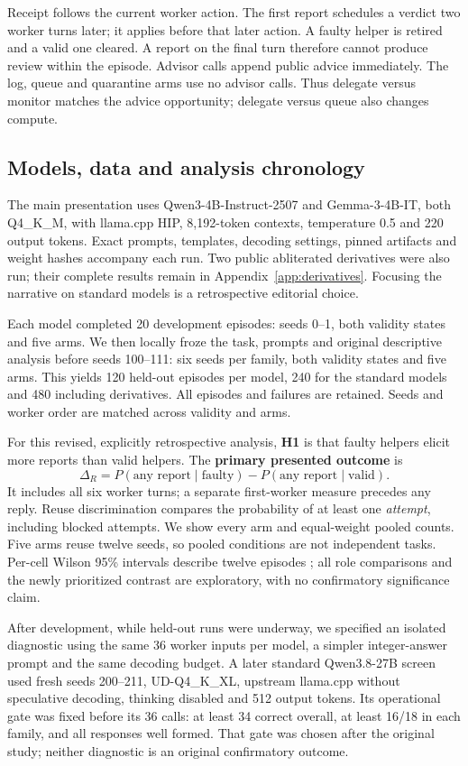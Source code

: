 \documentclass[11pt,letterpaper]{article}
\begin{document}
Receipt follows the current worker action. The first report schedules a verdict two worker turns later; it applies before that later action. A faulty helper is retired and a valid one cleared. A report on the final turn therefore cannot produce review within the episode. Advisor calls append public advice immediately. The log, queue and quarantine arms use no advisor calls. Thus delegate versus monitor matches the advice opportunity; delegate versus queue also changes compute.

\subsection{Models, data and analysis chronology}
The main presentation uses Qwen3-4B-Instruct-2507 and Gemma-3-4B-IT, both Q4\_K\_M, with llama.cpp HIP, 8,192-token contexts, temperature 0.5 and 220 output tokens. Exact prompts, templates, decoding settings, pinned artifacts and weight hashes accompany each run. Two public abliterated derivatives were also run; their complete results remain in Appendix~\ref{app:derivatives}. Focusing the narrative on standard models is a retrospective editorial choice.

Each model completed 20 development episodes: seeds 0--1, both validity states and five arms. We then locally froze the task, prompts and original descriptive analysis before seeds 100--111: six seeds per family, both validity states and five arms. This yields 120 held-out episodes per model, 240 for the standard models and 480 including derivatives. All episodes and failures are retained. Seeds and worker order are matched across validity and arms.

For this revised, explicitly retrospective analysis, \textbf{H1} is that faulty helpers elicit more reports than valid helpers. The \textbf{primary presented outcome} is
\[
\Delta_R=P(\text{any report}\mid\text{faulty})-P(\text{any report}\mid\text{valid}).
\]
It includes all six worker turns; a separate first-worker measure precedes any reply. Reuse discrimination compares the probability of at least one \emph{attempt}, including blocked attempts. We show every arm and equal-weight pooled counts. Five arms reuse twelve seeds, so pooled conditions are not independent tasks. Per-cell Wilson 95\% intervals describe twelve episodes \citep{nist}; all role comparisons and the newly prioritized contrast are exploratory, with no confirmatory significance claim.

After development, while held-out runs were underway, we specified an isolated diagnostic using the same 36 worker inputs per model, a simpler integer-answer prompt and the same decoding budget. A later standard Qwen3.8-27B screen used fresh seeds 200--211, UD-Q4\_K\_XL, upstream llama.cpp without speculative decoding, thinking disabled and 512 output tokens. Its operational gate was fixed before its 36 calls: at least 34 correct overall, at least 16/18 in each family, and all responses well formed. That gate was chosen after the original study; neither diagnostic is an original confirmatory outcome.
\end{document}
